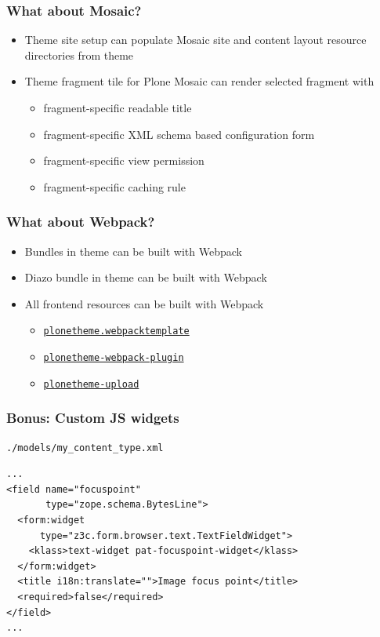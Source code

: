 \documentclass[aspectratio=43]{beamer}
\begin{document}
\begin{frame}[plain,t]
  \frametitle{What about Mosaic?}
  \begin{itemize}
  \setlength{\itemsep}{1em}
  \item Theme site setup can populate Mosaic site and content layout
  resource directories from theme
  \item Theme fragment tile for Plone Mosaic
  can render selected fragment with
  \vspace{1em}
  \begin{itemize}
  \setlength{\itemsep}{1em}
  \item fragment-specific readable title
  \item fragment-specific XML schema based configuration form
  \item fragment-specific view permission
  \item fragment-specific caching rule
  \end{itemize}
  \end{itemize}
\end{frame}


\begin{frame}[plain,t]
  \frametitle{What about Webpack?}
  \begin{itemize}
  \setlength{\itemsep}{1em}
  \item Bundles in theme can be built with Webpack
  \item Diazo bundle in theme can be built with Webpack
  \item All frontend resources can be built with Webpack
  \vspace{1em}
  \begin{itemize}
  \setlength{\itemsep}{1em}
  \item \href{https://github.com/collective/plonetheme.webpacktemplate}{\texttt{plonetheme.webpacktemplate}}
  \item \href{https://www.npmjs.com/package/plonetheme-webpack-plugin}{\texttt{plonetheme-webpack-plugin}}
  \item \href{https://www.npmjs.com/package/plonetheme-upload}{\texttt{plonetheme-upload}}
  \end{itemize}
  \end{itemize}
\end{frame}

\begin{frame}
\frametitle{Bonus: Custom JS widgets}
\begin{verbatim}
./models/my_content_type.xml
\end{verbatim}
\begin{verbatim}
...
<field name="focuspoint"
       type="zope.schema.BytesLine">
  <form:widget
      type="z3c.form.browser.text.TextFieldWidget">
    <klass>text-widget pat-focuspoint-widget</klass>
  </form:widget>
  <title i18n:translate="">Image focus point</title>
  <required>false</required>
</field>
...
\end{verbatim}
\end{frame}
\end{document}
